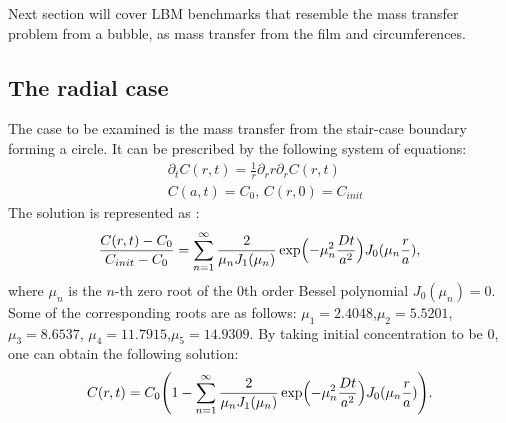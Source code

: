 \documentclass{article}
\newcommand{\beq}{\begin{equation}}
\newcommand{\feq}{\end{equation}}
\begin{document}
Next section will cover LBM benchmarks that resemble the mass transfer problem from a bubble, as 
mass transfer from the film  and circumferences.

\subsection{The radial case}
The case to be examined  is the mass transfer from the stair-case boundary forming a circle. It
can be
prescribed by the following system of equations:
\beq
\begin{aligned}
&\partial_t C(r,t)=\frac{1}{r}\partial_r r \partial_r C(r,t)\\
&C(a,t)=C_0,\,C(r,0)=C_{init}
\end{aligned}
\feq 
The solution is represented as \cite{chemical-correlations}:
\beq
\frac{C(r,t)-C_{0}}{C_{init}-C_{0}}=\sum_{n=1}^{\infty}{\frac{2}{\mu_n
J_1(\mu_n)}\exp\Bigl(-\mu_n^2 \frac{D t}{a^2} \Bigr)J_0(\mu_n \frac{r}{a})},
\feq
where $\mu_n$ is the $n$-th zero root of the $0$th order Bessel polynomial $J_0(\mu_n)=0$. Some of
the corresponding roots are as follows: $\mu_1=2.4048$,$\mu_2=5.5201$,$\mu_3=8.6537$,
$\mu_4=11.7915$,$\mu_5=14.9309$.
By taking initial concentration to be $0$, one can obtain the following solution:
\beq
C(r,t)=C_0 \Biggl(1 - \sum_{n=1}^{\infty}{\frac{2}{\mu_n
J_1(\mu_n)}\exp\Bigl(-\mu_n^2 \frac{D t}{a^2} \Bigr)J_0(\mu_n \frac{r}{a})}\Biggr).
\feq
\end{document}
